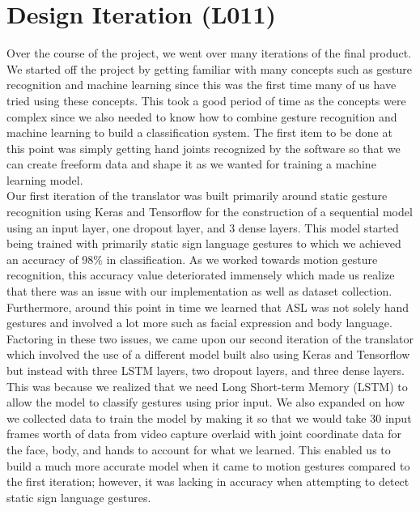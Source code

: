 \documentclass[12pt, titlepage]{article}
\begin{document}
\section{Design Iteration (L011)}

Over the course of the project, we went over many iterations of the final product. We started off the project by getting familiar with many concepts such as gesture recognition and machine learning since this was the first time many of us have tried using these concepts. This took a good period of time as the concepts were complex since we also needed to know how to combine gesture recognition and machine learning to build a classification system. The first item to be done at this point was simply getting hand joints recognized by the software so that we can create freeform data and shape it as we wanted for training a machine learning model.\\

\noindent Our first iteration of the translator was built primarily around static gesture recognition using Keras and Tensorflow for the construction of a sequential model using an input layer, one dropout layer, and 3 dense layers. This model started being trained with primarily static sign language gestures to which we achieved an accuracy of 98\% in classification. As we worked towards motion gesture recognition, this accuracy value deteriorated immensely which made us realize that there was an issue with our implementation as well as dataset collection. Furthermore, around this point in time we learned that ASL was not solely hand gestures and involved a lot more such as facial expression and body language. \\

\noindent Factoring in these two issues, we came upon our second iteration of the translator which involved the use of a different model built also using Keras and Tensorflow but instead with three LSTM layers, two dropout layers, and three dense layers. This was because we realized that we need Long Short-term Memory (LSTM) to allow the model to classify gestures using prior input. We also expanded on how we collected data to train the model by making it so that we would take 30 input frames worth of data from video capture overlaid with joint coordinate data for the face, body, and hands to account for what we learned. This enabled us to build a much more accurate model when it came to motion gestures compared to the first iteration; however, it was lacking in accuracy when attempting to detect static sign language gestures.\\
\end{document}
